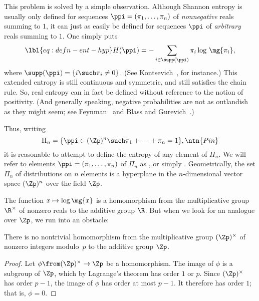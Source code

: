 This problem is solved by a simple observation.  Although Shannon entropy%
%
% 
is usually only defined for sequences $\ppi = (\pi_1, \ldots, \pi_n)$ of
\emph{nonnegative} reals summing to $1$, it can just as easily be defined
for sequences $\ppi$ of \emph{arbitrary} reals summing to $1$.  One simply
puts
% 
\begin{equation}
\lbl{eq:defn-ent-hyp}
H(\ppi) = - \sum_{i \in \supp(\ppi)} \pi_i \log \,\mg{\pi_i},
\end{equation}
% 
where $\supp(\ppi) 
%
\index{support}
%
= \{ i \such \pi_i \neq 0\}$.  (See Kontsevich~\cite{KontOHL},%
%
% 
for instance.)  This extended entropy is still continuous and symmetric,
and still satisfies the chain rule.  So, real entropy can in fact be
defined without reference to the notion of positivity.  (And generally
speaking, negative%
%
%
probabilities are not as outlandish as they might seem; see
Feynman~\cite{Feyn} and Blass and Gurevich~\cite{BlGuNP1,BlGuNP2}.)

Thus, writing
\[
\Pi_n = \{ \ppi \in (\Zp)^n \such \pi_1 + \cdots + \pi_n = 1 \},
\ntn{Pin}
\]
it is reasonable to attempt to define the entropy of any element of
$\Pi_n$.  We will refer to elements $\ppi = (\pi_1, \ldots, \pi_n)$ of
$\Pi_n$ as , or simply .%
%
%
Geometrically, the set $\Pi_n$ of
distributions on $n$ elements is a hyperplane in the $n$-dimensional vector
space $(\Zp)^n$ over the field $\Zp$.

The function $x \mapsto \log\mg{x}$ is a homomorphism from the
multiplicative group $\R^\times$ of nonzero reals to the additive
group $\R$.  But when we look for an analogue over $\Zp$, we run into
an obstacle:

\begin{lemma}
% 
There is no nontrivial homomorphism from the multiplicative group
$(\Zp)^\times$ of nonzero integers modulo~$p$ to the additive group $\Zp$.
\end{lemma}

\begin{proof}
Let $\phi\from (\Zp)^\times \to \Zp$ be a homomorphism.  The image of
$\phi$ is a subgroup of $\Zp$, which by Lagrange's theorem has order
$1$ or $p$.  Since $(\Zp)^\times$ has order $p - 1$, the image of
$\phi$ has order at most $p - 1$.  It therefore has order $1$; that is,
$\phi = 0$.
\end{proof}

